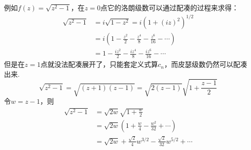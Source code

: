 例如\(f(z)=\sqrt{z^2-1}\)，在\(z=0\)点它的洛朗级数可以通过配凑的过程来求得：
\begin{align*}
    \sqrt{z^2-1} & =i\sqrt{1-z^2}=i\left(1+(iz)^2\right)^{1/2} \\
    &= i\left(1-\frac{z^2}{2}-\frac{z^4}{8}-\frac{z^6}{16}-\cdots\right)\\ 
    &= 1-\frac{iz^2}{2}-\frac{iz^4}{8}-\frac{iz^6}{16}-\cdots
\end{align*}
但是在\(z=1\)点就没法配凑展开了，只能套定义式算\(c_n\)，而皮瑟级数仍然可以配凑出来.
\[\sqrt{z^2-1}=\sqrt{(z+1)(z-1)}=\sqrt{2(z-1)}\sqrt{1+\frac{z-1}{2}}\]
令\(w=z-1\)，则
\begin{align*}
    \sqrt{z^2-1} &= \sqrt{2w}\sqrt{1+\frac{w}{2}} \\
    & = \sqrt{2w} \left( 1+\frac{w}{4}-\frac{w^2}{32}+\cdots \right)\\
    &= \sqrt{2w}+\frac{\sqrt{2}}{4}w^{3/2}-\frac{\sqrt{2}}{32}w^{5/2}+\cdots
\end{align*}
